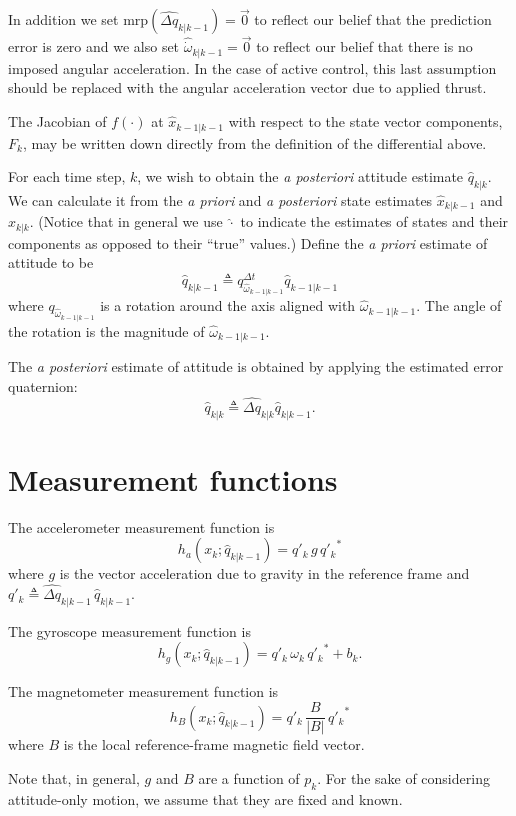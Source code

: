 \documentclass[a4paper]{paper}
\begin{document}
In addition we set $\mbox{mrp}(\hat{\Delta q}_{k|k-1}) = \vec{0}$ to reflect our
belief that the prediction error is zero and we also set
$\hat{\dot{\omega}}_{k|k-1} = \vec{0}$ to reflect our belief that there is no
imposed angular acceleration. In the case of active control, this last
assumption should be replaced with the angular acceleration vector due to
applied thrust.

The Jacobian of $f(\cdot)$ at $\hat{x}_{k-1|k-1}$ with respect to the state
vector components, $F_k$, may be written down directly from the definition of
the differential above.

For each time step, $k$, we wish to obtain the \emph{a posteriori} attitude
estimate $\hat{q}_{k|k}$. We can calculate it from the \emph{a priori} and
\emph{a posteriori} state estimates $\hat{x}_{k|k-1}$ and $\hat{x}_{k|k}$.
(Notice that in general we use $\hat{\cdot}$ to indicate the estimates of states
and their components as opposed to their ``true'' values.) Define the \emph{a
priori} estimate of attitude to be
$$
\hat{q}_{k|k-1} \triangleq q^{\Delta t}_{\hat{\omega}_{k-1|k-1}}
\hat{q}_{k-1|k-1}
$$
where $q_{\hat{\omega}_{k-1|k-1}}$ is a rotation around the axis aligned with
$\hat{\omega}_{k-1|k-1}$. The angle of the rotation is the magnitude of
$\hat{\omega}_{k-1|k-1}$.

The \emph{a posteriori} estimate of attitude is obtained by applying the
estimated error quaternion:
$$
\hat{q}_{k|k} \triangleq \hat{\Delta q}_{k|k} \hat{q}_{k|k-1}.
$$

\section{Measurement functions}

The accelerometer measurement function is
$$
h_a(x_k; \hat{q}_{k|k-1}) = q'_k \, g \, {q'_k}^*
$$
where $g$ is the vector acceleration due to gravity in the reference frame and
$q'_k \triangleq \hat{\Delta q}_{k|k-1} \, \hat{q}_{k|k-1}$. 

The gyroscope measurement function is
$$
h_g(x_k; \hat{q}_{k|k-1}) = q'_k \, \omega_k \, {q'_k}^* + b_k.
$$

The magnetometer measurement function is
$$
h_B(x_k;\hat{q}_{k|k-1}) = q'_k \, \frac{B}{|B|} \, {q'_k}^*
$$
where $B$ is the local reference-frame magnetic field vector.

Note that, in general, $g$ and $B$ are a function of $p_k$. For the sake of
considering attitude-only motion, we assume that they are fixed and known.
\end{document}

